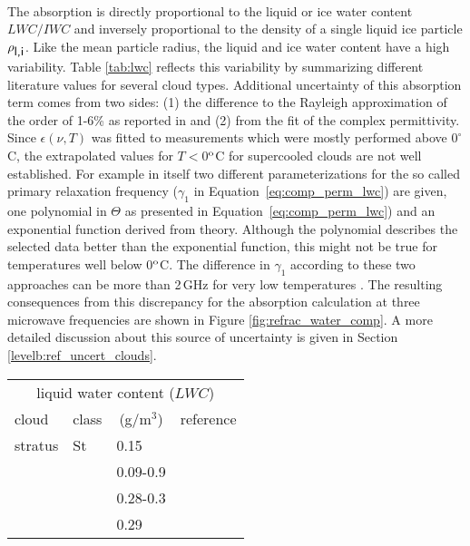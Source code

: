 {\begin{eqnarray}
\end{eqnarray}
%
The absorption is directly proportional to the liquid or ice water
content $LWC/IWC$ and inversely proportional to the density of a
single liquid ice particle $\rho_{\mbox{\sf l,i}}$. Like the mean particle radius,
the liquid and ice water content have a high variability. Table
\ref{tab:lwc} reflects this variability by summarizing different
literature values for several cloud types. Additional uncertainty 
of this absorption term comes from two sides: 
(1) the difference to the Rayleigh approximation
of the order of 1-6\% as reported in \citet{lietal:97} and (2) from
the fit of the complex permittivity.  Since $\epsilon(\nu,T)$ was
fitted to measurements which were mostly performed above $0^\circ$C,
the extrapolated values for $T<$0$^{\rm o}$C for supercooled
clouds are not well established. For example in \cite{liebeetal:91} 
itself two different parameterizations for the so called primary 
relaxation frequency ($\gamma_1$ in Equation~\ref{eq:comp_perm_lwc}) 
are given, one polynomial in $\Theta$ as presented in 
Equation~\ref{eq:comp_perm_lwc}) and an exponential function derived
from theory. Although the polynomial describes the selected 
data better than the exponential function, this might not be true for
temperatures well below 0$^{\rm o}$C.
The difference in $\gamma_1$ according to these two approaches can 
be more than 2\,GHz for very low temperatures \citep{liptonetal:99}. 
The resulting consequences from this discrepancy for the absorption 
calculation at three microwave frequencies are shown in 
Figure \ref{fig:refrac_water_comp}. A more detailed
discussion about this source of uncertainty is given in Section
\ref{levelb:ref_uncert_clouds}.
%
\begin{table}[!htb]
\begin{center}
\begin{tabular}{llll}
\hline
\multicolumn{4}{c}{liquid water content ($LWC$)} \\
 cloud        & class & \multicolumn{1}{c}{(g/m$^3$)} & reference\\
\hline
 stratus      & St    & 0.15        & \cite{salby:96}\\
              &       & 0.09-0.9    & \cite{seinfeld:98}\\
              &       & 0.28-0.3    & \cite{hess:98}\\
              &       & 0.29        & \cite{abreu:96}\\

\end{tabular}
\end{center}
\end{table}}
